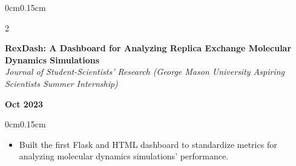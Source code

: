 \documentclass[10pt, letterpaper]{article}
\newenvironment{highlights}{
    \begin{itemize}[topsep=0pt, parsep=0pt, partopsep=0pt, itemsep=0pt, leftmargin=0.6cm]
}{
    \end{itemize}
}
\newenvironment{onecolentry}{
    \begin{adjustwidth}{0cm}{0.15cm}
}{
    \end{adjustwidth}
}
\newenvironment{twocolentry}[2][]{
    \onecolentry
    \def\secondColumn{#2}
    \setcolumnwidth{\fill, 4cm}
    \begin{paracol}{2}
}{
    \switchcolumn \raggedleft \secondColumn
    \end{paracol}
    \endonecolentry
}
\begin{document}
    \vspace{0.05cm}

    \begin{twocolentry}{\textbf{Oct 2023}}
        \textbf{RexDash: A Dashboard for Analyzing Replica Exchange Molecular Dynamics Simulations} \\
        \textit{Journal of Student-Scientists' Research (George Mason University Aspiring Scientists Summer Internship)}
    \end{twocolentry}
    \vspace{-0.05cm}
    \begin{onecolentry}
        \begin{highlights}
            \item Built the first Flask and HTML dashboard to standardize metrics for analyzing molecular dynamics simulations' performance.
        \end{highlights}
    \end{onecolentry}
\end{document}

